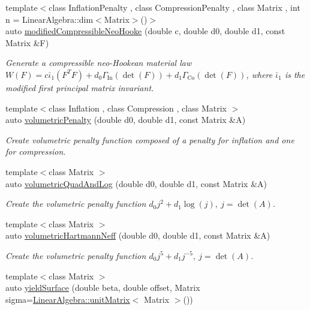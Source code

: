 \begin{DoxyCompactItemize}
{\footnotesize template$<$class Inflation\+Penalty , class Compression\+Penalty , class Matrix , int n = Linear\+Algebra\+::dim$<$\+Matrix$>$()$>$ }\\auto \hyperlink{group__Rubber_gac10942df03f037afdf0a81d330361a6b}{modified\+Compressible\+Neo\+Hooke} (double c, double d0, double d1, const Matrix \&F)
\begin{DoxyCompactList}\small\item\em Generate a compressible neo-\/\+Hookean material law $ W(F)=c\bar\iota_1(F^T F)+d_0\Gamma_\mathrm{In}(\det(F))+d_1\Gamma_\mathrm{Co}(\det(F)) $, where $\bar\iota_1$ is the modified first principal matrix invariant. \end{DoxyCompactList}\item 
{\footnotesize template$<$class Inflation , class Compression , class Matrix $>$ }\\auto \hyperlink{namespaceFunG_ad26faeb264bb4b1cd7e70f3811c366c8}{volumetric\+Penalty} (double d0, double d1, const Matrix \&A)
\begin{DoxyCompactList}\small\item\em Create volumetric penalty function composed of a penalty for inflation and one for compression. \end{DoxyCompactList}\item 
{\footnotesize template$<$class Matrix $>$ }\\auto \hyperlink{namespaceFunG_aaf30b9c36ed86e01b94f6b7c1d95cae8}{volumetric\+Quad\+And\+Log} (double d0, double d1, const Matrix \&A)
\begin{DoxyCompactList}\small\item\em Create the volumetric penalty function $ d_0 j^2 + d_1 \log(j),\ j=\det(A) $. \end{DoxyCompactList}\item 
{\footnotesize template$<$class Matrix $>$ }\\auto \hyperlink{namespaceFunG_adf4be5df85ea9df10cc9e11c11aaeb7b}{volumetric\+Hartmann\+Neff} (double d0, double d1, const Matrix \&A)
\begin{DoxyCompactList}\small\item\em Create the volumetric penalty function $ d_0 j^5 + d_1 j^{-5},\ j=\det(A) $. \end{DoxyCompactList}\item 
{\footnotesize template$<$class Matrix $>$ }\\auto \hyperlink{namespaceFunG_a4784211358c877f05ad9426850303273}{yield\+Surface} (double beta, double offset, Matrix sigma=\hyperlink{group__LinearAlgebraGroup_ga88a596b8526c0ed98ce241244fb85948}{Linear\+Algebra\+::unit\+Matrix}$<$ Matrix $>$())

\end{DoxyCompactItemize}
